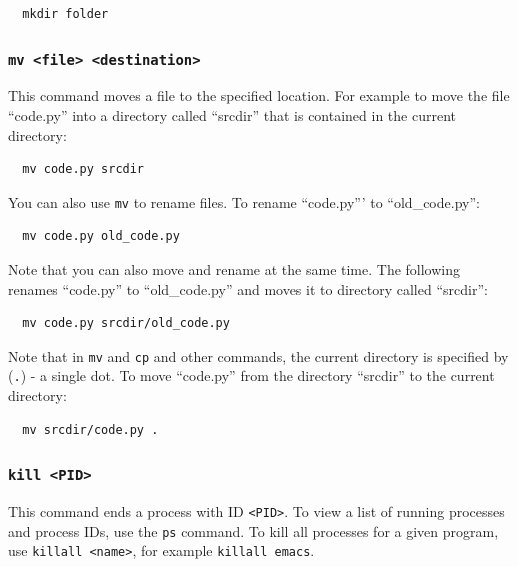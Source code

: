 \documentclass[10pt]{article}
\begin{document}
\begin{verbatim}
  mkdir folder
\end{verbatim}
	  
\subsubsection{\texttt{mv <file> <destination>}}
\noindent This command moves a file to the specified location.  For example to move the file ``code.py'' into a directory called ``srcdir'' that is contained in the current directory:

\begin{verbatim}
  mv code.py srcdir
\end{verbatim}

\noindent You can also use \texttt{mv} to rename files.  To rename ``code.py''' to ``old\_code.py'':
\begin{verbatim}
  mv code.py old_code.py
\end{verbatim}

\noindent Note that you can also move and rename at the same time.  The following renames ``code.py'' to ``old\_code.py'' and moves it to directory called ``srcdir'':
\begin{verbatim}
  mv code.py srcdir/old_code.py
\end{verbatim}

\noindent Note that in \texttt{mv} and \texttt{cp} and other commands, the current directory is specified by (\texttt{.}) - a single dot.  To move ``code.py'' from the directory ``srcdir'' to the current directory:
\begin{verbatim}
  mv srcdir/code.py .
\end{verbatim}

\subsubsection{\texttt{kill <PID>}}
\noindent This command ends a process with ID \verb|<PID>|.  To view a list of running processes and process IDs, use the \verb|ps| command.  To kill all processes for a given program,
use \verb|killall <name>|, for example \verb|killall emacs|.


\end{document}

